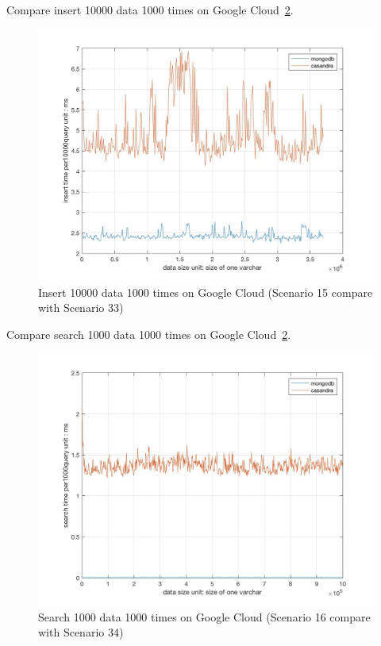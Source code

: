 Compare insert 10000 data 1000 times on Google Cloud~\ref{f:fly}.

\begin{figure}[!ht]
  \centering\includegraphics[width=\columnwidth]
  {images/insert_comp_10000_google.jpg}
  \caption{Insert 10000 data 1000 times on Google Cloud
  (Scenario 15 compare with Scenario 33)}\label{f:fly}
\end{figure}

Compare search 1000 data 1000 times on Google Cloud~\ref{f:fly}.

\begin{figure}[!ht]
  \centering\includegraphics[width=\columnwidth]
  {images/search_comp_1000_google.jpg}
  \caption{Search 1000 data 1000 times on Google Cloud
  (Scenario 16 compare with Scenario 34)}\label{f:fly}
\end{figure}

